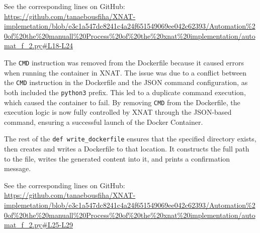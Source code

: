 
\lstset{style=allblack}


\normalsize
\lstset{inputpath=en/content}



\noindent\footnotesize{ See the corresponding lines on GitHub:\url{ https://github.com/tanaebousfiha/XNAT-implemetation/blob/e3c1a547dc8241c4a24f651549069ee042c62393/Automation%20of%20the%20manuall%20Process%20of%20the%20xnat%20implementation/automat_f_2.py#L18-L24}}

\normalsize
 The \texttt{CMD} instruction was removed from the Dockerfile because it caused errors when running the container in XNAT. The issue was due to a conflict between the \texttt{CMD} instruction in the Dockerfile and the JSON command configuration, as both included the \texttt{python3} prefix. This led to a duplicate command execution, which caused the container to fail. By removing \texttt{CMD} from the Dockerfile, the execution logic is now fully controlled by XNAT through the JSON-based command, ensuring a successful launch of the Docker Container.

The rest of the \texttt{def write\_dockerfile} ensures that the specified directory exists, then creates and writes a Dockerfile to that location. It constructs the full path to the file, writes the generated content into it, and prints a confirmation message.






\noindent\footnotesize See the corresponding lines on GitHub:\url{ https://github.com/tanaebousfiha/XNAT-implemetation/blob/e3c1a547dc8241c4a24f651549069ee042c62393/Automation%20of%20the%20manuall%20Process%20of%20the%20xnat%20implementation/automat_f_2.py#L25-L29}
\normalsize







